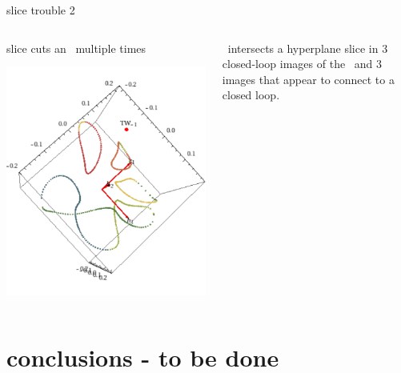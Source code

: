 \documentclass{beamer}
\begin{document}
\begin{frame}{slice trouble 2}
 \begin{columns}
\begin{block}{slice cuts an \rpo\ multiple times}
\begin{center}
\includegraphics[width=1.00\textwidth]
            {../../figs/ks22rpo16mfAll}
\end{center}
\end{block}
\Rpo\ intersects a hyperplane slice in $3$ closed-loop images of
the \rpo\ and $3$ images that appear to connect to a closed
loop.
  \end{columns}
\end{frame}



\section[Summary]{conclusions - to be done}
\end{document}
